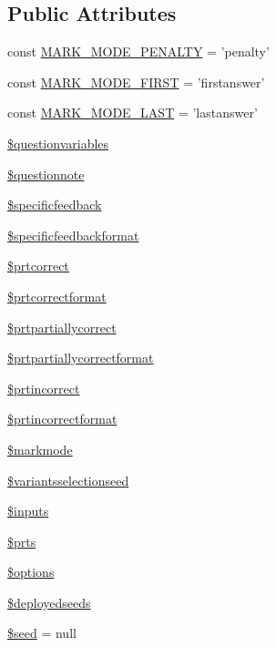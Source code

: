 \subsection*{Public Attributes}
\begin{DoxyCompactItemize}
\item 
const \hyperlink{classqtype__stack__question_a588ba6d7b21ea84f8a71e69e9f02c625}{MARK\_\-MODE\_\-PENALTY} = 'penalty'
\item 
const \hyperlink{classqtype__stack__question_a790b80668709d381e495a84800db165a}{MARK\_\-MODE\_\-FIRST} = 'firstanswer'
\item 
const \hyperlink{classqtype__stack__question_aa701dff20296ed3c2c63b82b28636f44}{MARK\_\-MODE\_\-LAST} = 'lastanswer'
\item 
\hyperlink{classqtype__stack__question_a4008515fcecf51157d1e3f1852d96906}{\$questionvariables}
\item 
\hyperlink{classqtype__stack__question_a8522e9220cc7c3cf500c21c4139c79cf}{\$questionnote}
\item 
\hyperlink{classqtype__stack__question_a2d613a3f7143cd7d7e65719443461219}{\$specificfeedback}
\item 
\hyperlink{classqtype__stack__question_acaa6d5b0c8bc222cfc448c3246e85dae}{\$specificfeedbackformat}
\item 
\hyperlink{classqtype__stack__question_a2489206abd13bb3322c09d4bf3229dc3}{\$prtcorrect}
\item 
\hyperlink{classqtype__stack__question_a7963e6df86de0cd29476b6dd51d77582}{\$prtcorrectformat}
\item 
\hyperlink{classqtype__stack__question_a403b775d50cf893d851d762b794866ba}{\$prtpartiallycorrect}
\item 
\hyperlink{classqtype__stack__question_af6c5c06c77b32e642c9f17baf7d8e9ea}{\$prtpartiallycorrectformat}
\item 
\hyperlink{classqtype__stack__question_a0a422dfcc412d953ef6377abf3c6c55e}{\$prtincorrect}
\item 
\hyperlink{classqtype__stack__question_aa22eb8f1dacaf4fa01cc3eb87787b5e6}{\$prtincorrectformat}
\item 
\hyperlink{classqtype__stack__question_a89b95812f12400531ce9db967019aa56}{\$markmode}
\item 
\hyperlink{classqtype__stack__question_a132af9dd30e31dbe58cc5b8b95dc91ef}{\$variantsselectionseed}
\item 
\hyperlink{classqtype__stack__question_aea3ef5cc024d400fc7749a480c4c4bd8}{\$inputs}
\item 
\hyperlink{classqtype__stack__question_a61c011482c257505caf2bfe5e92382e7}{\$prts}
\item 
\hyperlink{classqtype__stack__question_a06c6261b3cd293c85f09e0f3d7de44b0}{\$options}
\item 
\hyperlink{classqtype__stack__question_a3d10e7135cb980711af39923d660c6ef}{\$deployedseeds}
\item 
\hyperlink{classqtype__stack__question_a8ceb37a1b17061f427117571a9555e0e}{\$seed} = null
\end{DoxyCompactItemize}
